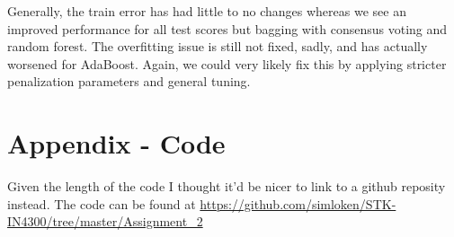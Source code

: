 \documentclass{article}
\begin{document}
Generally, the train error has had little to no changes whereas we see an improved performance for all test scores but bagging with consensus voting and random forest. The overfitting issue is still not fixed, sadly, and has actually worsened for AdaBoost. Again, we could very likely fix this by applying stricter penalization parameters and general tuning.


\newpage
\section*{Appendix - Code}
Given the length of the code I thought it'd be nicer to link to a github reposity instead. \newline
The code can be found at \url{https://github.com/simloken/STK-IN4300/tree/master/Assignment_2}
\end{document}
